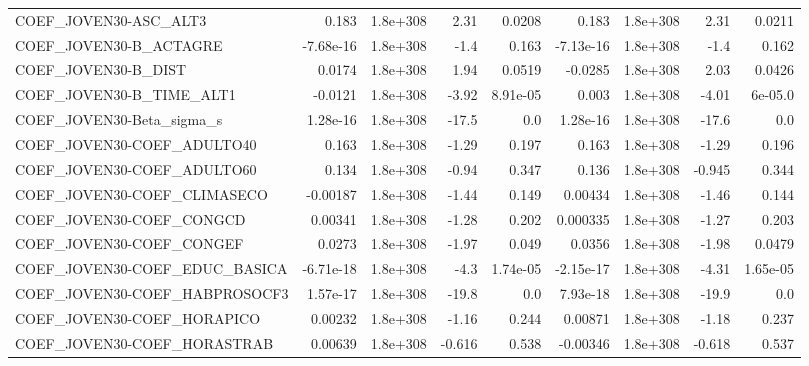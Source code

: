 \begin{tabular}{lrrrrrrrr}
COEF\_JOVEN30-ASC\_ALT3             &       0.183 &     1.8e+308 &      2.31 &   0.0208 &      0.183 &    1.8e+308 &         2.31 &        0.0211 \\
COEF\_JOVEN30-B\_ACTAGRE            &   -7.68e-16 &     1.8e+308 &      -1.4 &    0.163 &  -7.13e-16 &    1.8e+308 &         -1.4 &         0.162 \\
COEF\_JOVEN30-B\_DIST               &      0.0174 &     1.8e+308 &      1.94 &   0.0519 &    -0.0285 &    1.8e+308 &         2.03 &        0.0426 \\
COEF\_JOVEN30-B\_TIME\_ALT1          &     -0.0121 &     1.8e+308 &     -3.92 & 8.91e-05 &      0.003 &    1.8e+308 &        -4.01 &       6e-05.0 \\
COEF\_JOVEN30-Beta\_sigma\_s         &    1.28e-16 &     1.8e+308 &     -17.5 &      0.0 &   1.28e-16 &    1.8e+308 &        -17.6 &           0.0 \\
COEF\_JOVEN30-COEF\_ADULTO40        &       0.163 &     1.8e+308 &     -1.29 &    0.197 &      0.163 &    1.8e+308 &        -1.29 &         0.196 \\
COEF\_JOVEN30-COEF\_ADULTO60        &       0.134 &     1.8e+308 &     -0.94 &    0.347 &      0.136 &    1.8e+308 &       -0.945 &         0.344 \\
COEF\_JOVEN30-COEF\_CLIMASECO       &    -0.00187 &     1.8e+308 &     -1.44 &    0.149 &    0.00434 &    1.8e+308 &        -1.46 &         0.144 \\
COEF\_JOVEN30-COEF\_CONGCD          &     0.00341 &     1.8e+308 &     -1.28 &    0.202 &   0.000335 &    1.8e+308 &        -1.27 &         0.203 \\
COEF\_JOVEN30-COEF\_CONGEF          &      0.0273 &     1.8e+308 &     -1.97 &    0.049 &     0.0356 &    1.8e+308 &        -1.98 &        0.0479 \\
COEF\_JOVEN30-COEF\_EDUC\_BASICA     &   -6.71e-18 &     1.8e+308 &      -4.3 & 1.74e-05 &  -2.15e-17 &    1.8e+308 &        -4.31 &      1.65e-05 \\
COEF\_JOVEN30-COEF\_HABPROSOCF3     &    1.57e-17 &     1.8e+308 &     -19.8 &      0.0 &   7.93e-18 &    1.8e+308 &        -19.9 &           0.0 \\
COEF\_JOVEN30-COEF\_HORAPICO        &     0.00232 &     1.8e+308 &     -1.16 &    0.244 &    0.00871 &    1.8e+308 &        -1.18 &         0.237 \\
COEF\_JOVEN30-COEF\_HORASTRAB       &     0.00639 &     1.8e+308 &    -0.616 &    0.538 &   -0.00346 &    1.8e+308 &       -0.618 &         0.537 \\

\end{tabular}
